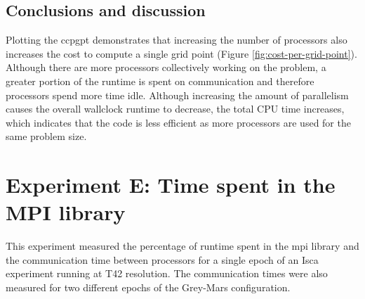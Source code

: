 \documentclass[a4paper,11pt]{report}
\begin{document}
\subsection{Conclusions and discussion}
Plotting the \gls{ccpgpt} demonstrates that increasing the number of processors also increases the cost to compute a single grid point (Figure \ref{fig:cost-per-grid-point}). Although there are more processors collectively working on the problem, a greater portion of the runtime is spent on communication and therefore processors spend more time idle. Although increasing the amount of parallelism causes the overall wallclock runtime to decrease, the total CPU time increases, which indicates that the code is less efficient as more processors are used for the same problem size. 

\section{Experiment E: Time spent in the MPI library}
\label{sec:mpi-comms}
This experiment measured the percentage of runtime spent in the \gls{mpi} library and the communication time between processors for a single epoch of an Isca experiment running at T42 resolution. The communication times were also measured for two different epochs of the Grey-Mars configuration.
\end{document}
